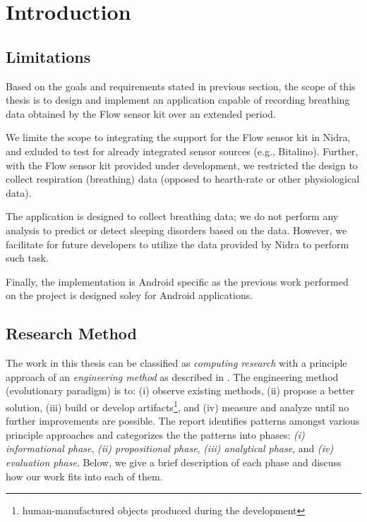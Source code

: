 \chapter{Introduction}\label{introduction}




\section{Limitations}
Based on the goals and requirements stated in previous section, the scope of this thesis is to design and implement an application capable of recording breathing data obtained by the Flow sensor kit over an extended period. 

We limite the scope to integrating the support for the Flow sensor kit in Nidra, and exluded to test for already integrated sensor sources (e.g., Bitalino). Further, with the Flow sensor kit provided under development, we restricted the design to collect respiration (breathing) data (opposed to hearth-rate or other physiological data).

The application is designed to collect breathing data; we do not perform any analysis to predict or detect sleeping disorders based on the data. However, we facilitate for future developers to utilize the data provided by Nidra to perform such task.

Finally, the implementation is Android specific as the previous work performed on the project is designed soley for Android applications. 

\section{Research Method}
The work in this thesis can be classified as \textit{computing research} with a principle approach of an \textit{engineering method} as described in \cite{Glass_1995}. The engineering method (evolutionary paradigm) is to: (i) observe existing methods, (ii) propose a better solution, (iii)  build or develop artifacts\footnote{human-manufactured objects produced during the development}, and (iv) measure and analyze until no further improvements are possible. The report identifies patterns amongst various principle approaches and categorizes the the patterns into phases: \textit{(i) informational phase}, \textit{(ii) propositional phase}, \textit{(iii) analytical phase}, and \textit{(iv) evaluation phase}. Below, we give a brief description of each phase and discuss how our work fits into each of them. 

